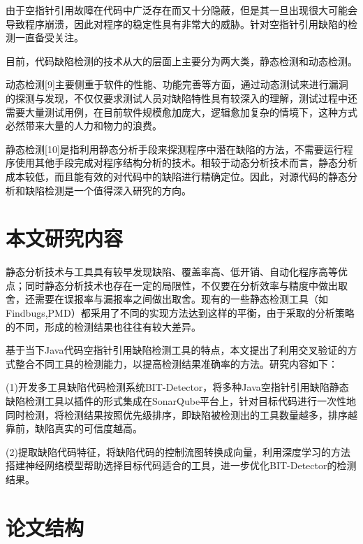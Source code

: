 由于空指针引用故障在代码中广泛存在而又十分隐蔽，但是其一旦出现很大可能会导致程序崩溃，因此对程序的稳定性具有非常大的威胁。针对空指针引用缺陷的检测一直备受关注。

目前，代码缺陷检测的技术从大的层面上主要分为两大类，静态检测和动态检测。

动态检测[9]主要侧重于软件的性能、功能完善等方面，通过动态测试来进行漏洞的探测与发现，不仅仅要求测试人员对缺陷特性具有较深入的理解，测试过程中还需要大量测试用例，在目前软件规模愈加庞大，逻辑愈加复杂的情境下，这种方式必然带来大量的人力和物力的浪费。

静态检测[10]是指利用静态分析手段来探测程序中潜在缺陷的方法，不需要运行程序使用其他手段完成对程序结构分析的技术。相较于动态分析技术而言，静态分析成本较低，而且能有效的对代码中的缺陷进行精确定位。因此，对源代码的静态分析和缺陷检测是一个值得深入研究的方向。


\section{本文研究内容}
静态分析技术与工具具有较早发现缺陷、覆盖率高、低开销、自动化程序高等优点；同时静态分析技术也存在一定的局限性，不仅要在分析效率与精度中做出取舍，还需要在误报率与漏报率之间做出取舍。现有的一些静态检测工具（如Findbugs,PMD）都采用了不同的实现方法达到这样的平衡，由于采取的分析策略的不同，形成的检测结果也往往有较大差异。

基于当下Java代码空指针引用缺陷检测工具的特点，本文提出了利用交叉验证的方式整合不同工具的检测能力，以提高检测结果准确率的方法。研究内容如下：

(1)开发多工具缺陷代码检测系统BIT-Detector，将多种Java空指针引用缺陷静态缺陷检测工具以插件的形式集成在SonarQube平台上，针对目标代码进行一次性地同时检测，将检测结果按照优先级排序，即缺陷被检测出的工具数量越多，排序越靠前，缺陷真实的可信度越高。

(2)提取缺陷代码特征，将缺陷代码的控制流图转换成向量，利用深度学习的方法搭建神经网络模型帮助选择目标代码适合的工具，进一步优化BIT-Detector的检测结果。

\section{论文结构}
